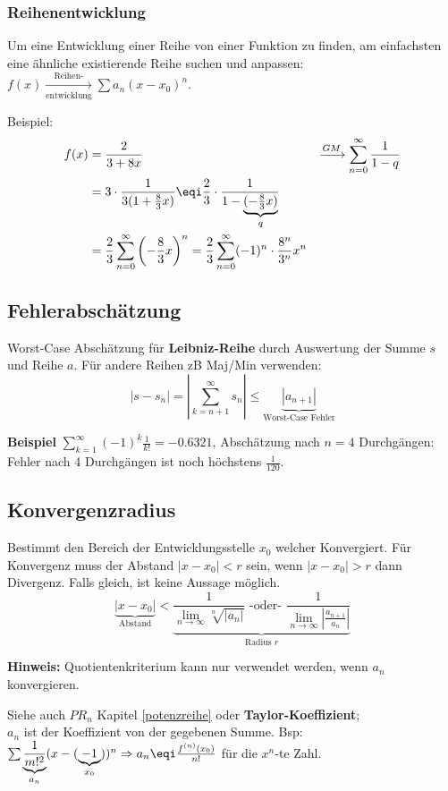 \subsubsection{Reihenentwicklung}
Um eine Entwicklung einer Reihe von einer Funktion zu finden, am einfachsten eine ähnliche existierende Reihe suchen und anpassen: $f(x) \xrightarrow[\text{entwicklung}]{\text{Reihen-}} \sum a_n(x - x_0)^n$.

\noindent Beispiel:
\begin{align*}
	f(x) &= \frac{2}{3+8x} &\xrightarrow{GM} \sum_{n=0}^{\infty}\frac{1}{1-q} \\
	&= 3\cdot \frac{1}{3(1 + \tfrac{8}{3}x)} \eqi \frac{2}{3}\cdot \frac{1}{1 - \underbrace{(-\tfrac{8}{3}x)}_q} \\
	&= \frac{2}{3}\sum_{n=0}^{\infty}\left(-\frac{8}{3}x\right)^n = \frac{2}{3}\sum_{n=0}^{\infty}(-1)^n \cdot \frac{8^n}{3^n}x^n
\end{align*}

\subsection{Fehlerabschätzung}
Worst-Case Abschätzung für \textbf{Leibniz-Reihe} durch Auswertung der Summe $s$ und Reihe $a$. Für andere Reihen zB Maj/Min verwenden:
\[\left|s - s_n\right| = \left|\sum_{k=n+1}^{\infty}s_n\right| \leq \underbrace{\left|a_{n+1}\right|}_\text{Worst-Case Fehler}\]

\noindent \textbf{Beispiel} $\sum_{k=1}^{\infty}(-1)^k\frac{1}{k!} = -0.6321$, Abschätzung nach $n=4$ Durchgängen: Fehler nach 4 Durchgängen ist noch höchstens $\tfrac{1}{120}$.

\subsection{Konvergenzradius}
Bestimmt den Bereich der Entwicklungsstelle $x_0$ welcher Konvergiert.
\noindent Für Konvergenz muss der Abstand $\left|x - x_0\right| < r$ sein, wenn $\left|x - x_0\right| > r$ dann Divergenz. Falls gleich, ist keine Aussage möglich. 
\[
\underbrace{\left|x - x_0\right|}_{\text{Abstand}} < \underbrace{\frac{1}{\lim\limits_{n \rightarrow \infty}\sqrt[n]{\left|a_n\right|}} \text{ -oder- } \frac{1}{\lim\limits_{n \rightarrow \infty}{\left|\frac{a_{n+1}}{a_n}\right|}}}_{\text{Radius } r}
\]

\noindent\textbf{Hinweis:} Quotientenkriterium kann nur verwendet werden, wenn $a_n$ konvergieren.


\noindent Siehe auch $PR_n$ Kapitel \ref{potenzreihe} oder \textbf{Taylor-Koeffizient}; 
\\$a_n$ ist der Koeffizient von der gegebenen Summe. Bsp: $\sum \underbrace{\frac{1}{m!^2}}_{a_n}(x - (\underbrace{- 1}_{ x_0}))^n \Rightarrow a_n\eqi \frac{f^{(n)}(x_0)}{n!}$ für die $x^n$-te Zahl.

